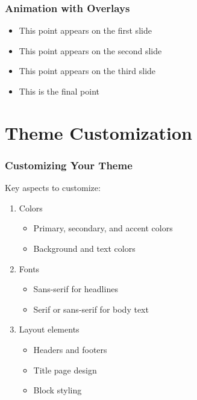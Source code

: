 \documentclass{beamer}
\begin{document}
\begin{frame}
  \frametitle{Animation with Overlays}
  
  \begin{itemize}
    \item<1-> This point appears on the first slide
    \item<2-> This point appears on the second slide
    \item<3-> This point appears on the third slide
    \item<4-> This is the final point
  \end{itemize}
  
  
  
\end{frame}

\section{Theme Customization}

\begin{frame}
  \frametitle{Customizing Your Theme}
  
  Key aspects to customize:
  
  \begin{enumerate}
    \item Colors
    \begin{itemize}
      \item Primary, secondary, and accent colors
      \item Background and text colors
    \end{itemize}
    
    \item Fonts
    \begin{itemize}
      \item Sans-serif for headlines
      \item Serif or sans-serif for body text
    \end{itemize}
    
    \item Layout elements
    \begin{itemize}
      \item Headers and footers
      \item Title page design
      \item Block styling
    \end{itemize}
  \end{enumerate}
\end{frame}
\end{document}
